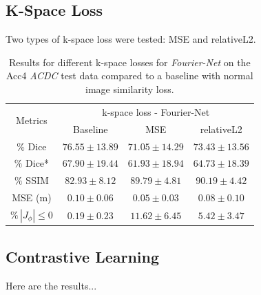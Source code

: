 \documentclass[english,version-2022-01]{uzl-thesis} %
\begin{document}
\subsection{K-Space Loss}
Two types of k-space loss were tested: MSE and relativeL2.

\begin{table}[h] %
	\centering
	\caption{Results for different k-space losses for \emph{Fourier-Net} on the Acc4 \emph{ACDC} test data compared to a baseline with normal image similarity loss.}
	\label{tab:ContrastiveLossFourierNetAcc4}
	\begin{tabular}{c c c c} %
		\toprule
		\multirow{2}{*}{Metrics} & \multicolumn{3}{c}{k-space loss - Fourier-Net} \\
		\cline{2-4}
		 & Baseline & MSE & relativeL2 \\		
		\midrule
		$\%$ Dice & $76.55 \pm 13.89$ & $71.05 \pm 14.29$ & $73.43 \pm 13.56$ \\
		$\%$ Dice* & $$67.90 \pm 19.44$$ & $61.93 \pm 18.94$ & $64.73 \pm 18.39$ \\
		$\%$ SSIM & $82.93 \pm 8.12$ & $89.79 \pm 4.81$ & $90.19 \pm 4.42$ \\
		MSE (m) & $0.10 \pm 0.06$ & $0.05 \pm 0.03$ & $0.08 \pm 0.10$ \\
		$\% \, |J_{\phi}|\leq0$ & $0.19 \pm 0.23$ & $11.62 \pm 6.45$ & $5.42 \pm 3.47$ \\
		\bottomrule
	\end{tabular}	
\end{table}


\subsection{Contrastive Learning} \label{SubSec:ContrastiveLearningResults}
Here are the results...
\end{document}

